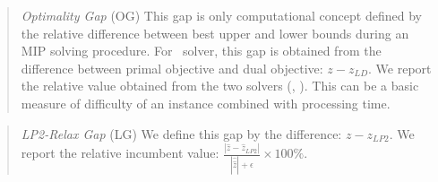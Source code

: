 \begin{quote}
	\noindent\textit{Optimality Gap} (OG) This gap is only computational concept defined by the relative difference between best upper and lower bounds during an MIP solving procedure. For \dsp\ solver, this gap is obtained from the difference between primal objective and dual objective: $z-z_{LD}$. We report the relative value obtained from the two solvers (\cplex, \dsp). This can be a basic measure of difficulty of an instance combined with processing time.
\end{quote}

\begin{quote}
	\noindent\textit{LP2-Relax Gap} (LG) We define this gap by the difference: $z-z_{LP2}$. We report the relative incumbent value: $\frac{|\hat{z}-\hat{z}_{LP2}|}{|\hat{\hat{z}}|+\epsilon}\times 100\%$.
	
\end{quote}

%

